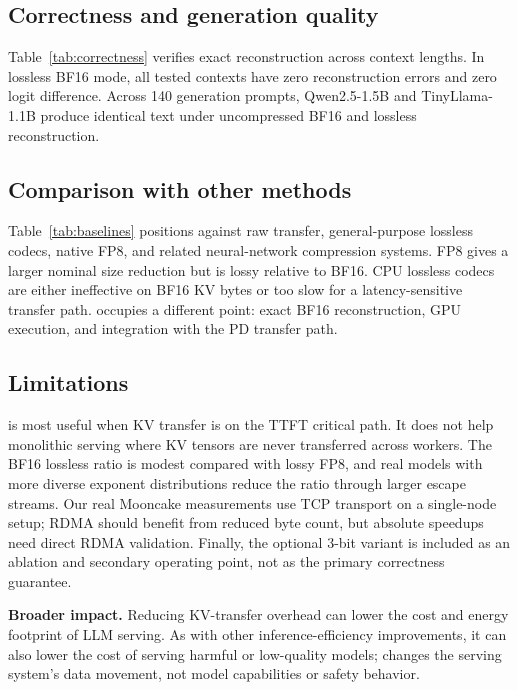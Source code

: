

\subsection{Correctness and generation quality}

Table~\ref{tab:correctness} verifies exact reconstruction across context lengths. In lossless BF16 mode, all tested contexts have zero reconstruction errors and zero logit difference. Across 140 generation prompts, Qwen2.5-1.5B and TinyLlama-1.1B produce identical text under uncompressed BF16 and lossless \splitzip reconstruction.



\subsection{Comparison with other methods}

Table~\ref{tab:baselines} positions \splitzip against raw transfer, general-purpose lossless codecs, native FP8, and related neural-network compression systems. FP8 gives a larger nominal size reduction but is lossy relative to BF16. CPU lossless codecs are either ineffective on BF16 KV bytes or too slow for a latency-sensitive transfer path. \splitzip occupies a different point: exact BF16 reconstruction, GPU execution, and integration with the PD transfer path.



\subsection{Limitations}
\label{sec:limitations}

\splitzip is most useful when KV transfer is on the TTFT critical path. It does not help monolithic serving where KV tensors are never transferred across workers. The BF16 lossless ratio is modest compared with lossy FP8, and real models with more diverse exponent distributions reduce the ratio through larger escape streams. Our real Mooncake measurements use TCP transport on a single-node setup; RDMA should benefit from reduced byte count, but absolute speedups need direct RDMA validation. Finally, the optional 3-bit variant is included as an ablation and secondary operating point, not as the primary correctness guarantee.

\textbf{Broader impact.}
Reducing KV-transfer overhead can lower the cost and energy footprint of LLM serving. As with other inference-efficiency improvements, it can also lower the cost of serving harmful or low-quality models; \splitzip changes the serving system's data movement, not model capabilities or safety behavior.
